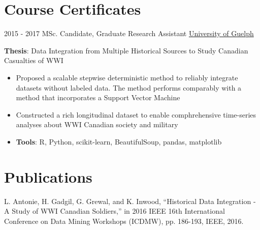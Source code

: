 \documentclass[letterpaper]{twentysecondcv} %
\begin{document}
\section{Course Certificates}
\begin{twenty}
	\twentyitem
    	{2015 - 2017}
		{}
        {MSc. Candidate, Graduate Research Assistant}
        {\href{http://www.uoguelph.ca/}{University of Guelph}}
        {}
        {
       	\textbf{Thesis}: Data Integration from Multiple Historical Sources to Study Canadian Casualties of WWI
        {\begin{itemize}
        \item Proposed a scalable stepwise deterministic method to reliably integrate datasets without labeled data. The method performs comparably with a method that incorporates a Support Vector Machine
        \item Constructed a rich longitudinal dataset to enable comphrehensive time-series analyses about WWI Canadian society and military
        \item \textbf{Tools}: R, Python, scikit-learn, BeautifulSoup, pandas, matplotlib \vspace{2mm}
		\end{itemize}}
        }
\end{twenty}

\section{Publications}
L. Antonie, H. Gadgil, G. Grewal, and K. Inwood, “Historical Data Integration - A Study of WWI Canadian Soldiers,” in 2016 IEEE 16th International Conference on Data Mining Workshops (ICDMW), pp. 186-193, IEEE, 2016. \vspace{2mm}
\end{document}
